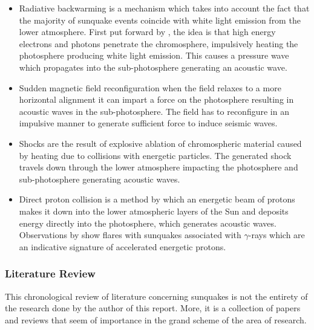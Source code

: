 \documentclass[11pt]{article}
\begin{document}
\begin{itemize}
\item Radiative backwarming \citep{1989SoPh..124..303M} is a mechanism which takes into account the fact that the majority of sunquake events coincide with white light emission from the lower atmosphere. First put forward by \cite{2005ApJ...630.1168D}, the idea is that high energy electrons and photons penetrate the chromosphere, impulsively heating the photosphere producing white light emission. This causes a pressure wave which propagates into the sub-photosphere generating an acoustic wave. 
     
\item Sudden magnetic field reconfiguration \citep{2008ASPC..383..221H} when the field relaxes to a more horizontal alignment it can impart a force on the photosphere resulting in acoustic waves in the sub-photosphere. The field has to reconfigure in an impulsive manner to generate sufficient force to induce seismic waves. 

\item Shocks \citep{1998Natur.393..317K} are the result of explosive ablation of chromospheric material caused by heating due to collisions with energetic particles. The generated shock travels down through the lower atmosphere impacting the photosphere and sub-photosphere generating acoustic waves.  

\item Direct proton collision is a method by which an energetic beam of protons makes it down into the lower atmospheric layers of the Sun and deposits energy directly into the photosphere, which generates acoustic waves. Observations by \cite{2007ApJ...664..573Z} show flares with sunquakes associated with $\gamma$-rays which are an indicative signature of accelerated energetic protons.
\end{itemize}

\subsubsection{Literature Review}
This chronological review of literature concerning sunquakes is not the entirety of the research done by the author of this report. More, it is a collection of papers and reviews that seem of importance in the grand scheme of the area of research.   \\
\end{document}
